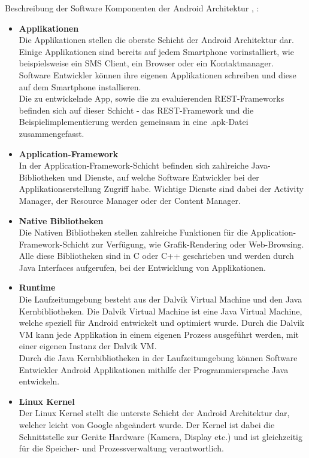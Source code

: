Beschreibung der Software Komponenten der Android Architektur \cite{overviewAndroid:singh}, \cite{androidTutorialOS}: 
\begin{itemize}
	\item \textbf{Applikationen}\\
	Die Applikationen stellen die oberste Schicht der Android Architektur dar. Einige Applikationen sind bereits auf jedem Smartphone vorinstalliert, wie beispielsweise ein SMS Client,  ein Browser oder ein Kontaktmanager. Software Entwickler können ihre eigenen Applikationen schreiben und diese auf dem Smartphone installieren.\\
	Die zu entwickelnde App, sowie die zu evaluierenden REST-Frameworks befinden sich auf dieser Schicht - das REST-Framework und die Beispielimplementierung werden gemeinsam in eine .apk-Datei zusammengefasst.
	\item \textbf{Application-Framework}\\
    In der Application-Framework-Schicht befinden sich zahlreiche Java-Bibliotheken und Dienste, auf welche Software Entwickler bei der Applikationserstellung Zugriff habe. Wichtige Dienste sind dabei der Activity Manager, der Resource Manager oder der Content Manager.
	\item \textbf{Native Bibliotheken}\\
	Die Nativen Bibliotheken stellen zahlreiche Funktionen für die Application-Framework-Schicht zur Verfügung, wie Grafik-Rendering oder Web-Browsing. Alle diese Bibliotheken sind in C oder C++ geschrieben und werden durch Java Interfaces aufgerufen, bei der Entwicklung von Applikationen.
	\item \textbf{Runtime}\\
	Die Laufzeitumgebung besteht aus der Dalvik Virtual Machine und den Java Kernbibliotheken. Die Dalvik Virtual Machine ist eine Java Virtual Machine, welche speziell für Android entwickelt und optimiert wurde.  Durch die  Dalvik VM kann jede Applikation in einem eigenen Prozess ausgeführt werden, mit einer eigenen Instanz der Dalvik VM. \\
	Durch die Java Kernbibliotheken in der Laufzeitumgebung können Software Entwickler Android Applikationen mithilfe der Programmiersprache Java entwickeln.   
	\item \textbf{Linux Kernel}\\
	Der Linux Kernel stellt die unterste Schicht der Android Architektur dar, welcher leicht von Google abgeändert wurde. Der Kernel ist dabei die Schnittstelle zur Geräte Hardware (Kamera, Display etc.) und ist gleichzeitig für die Speicher- und Prozessverwaltung verantwortlich.
\end{itemize}
	
